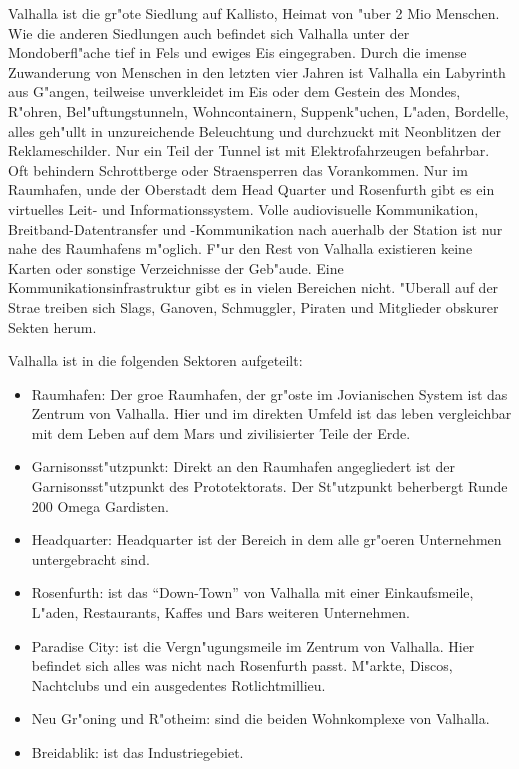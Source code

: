 
Valhalla ist die gr"o\3te Siedlung auf Kallisto, Heimat von "uber 2 Mio Menschen. Wie die anderen Siedlungen auch befindet sich Valhalla unter der Mondoberfl"ache tief in Fels und ewiges Eis eingegraben. Durch die imense Zuwanderung von Menschen in den letzten vier Jahren ist Valhalla ein Labyrinth aus G"angen, teilweise unverkleidet im Eis oder dem Gestein des Mondes, R"ohren, Bel"uftungstunneln, Wohncontainern, Suppenk"uchen, L"aden, Bordelle, alles geh"ullt in unzureichende Beleuchtung und durchzuckt mit Neonblitzen der Reklameschilder. Nur ein Teil der Tunnel ist mit Elektrofahrzeugen befahrbar. Oft behindern Schrottberge oder Stra\3ensperren das Vorankommen. Nur im Raumhafen, unde der Oberstadt dem Head Quarter und Rosenfurth gibt es ein virtuelles Leit- und Informationssystem. Volle audiovisuelle Kommunikation, Breitband-Datentransfer und -Kommunikation nach au\3erhalb der Station ist nur nahe des Raumhafens m"oglich. F"ur den Rest von Valhalla existieren keine Karten oder sonstige Verzeichnisse der Geb"aude. Eine Kommunikationsinfrastruktur gibt es in vielen Bereichen nicht. "Uberall auf der Stra\3e treiben sich Slags, Ganoven, Schmuggler, Piraten  und Mitglieder obskurer Sekten herum.


Valhalla ist in die folgenden Sektoren aufgeteilt:

\begin{itemize}
    \item Raumhafen: Der gro\3e Raumhafen, der gr"oste im Jovianischen System ist das Zentrum von Valhalla. Hier und im direkten Umfeld ist das leben vergleichbar mit dem Leben auf dem Mars und zivilisierter Teile der Erde.
    \item Garnisonsst"utzpunkt: Direkt an den Raumhafen angegliedert ist der Garnisonsst"utzpunkt des Prototektorats. Der St"utzpunkt beherbergt Runde 200 Omega Gardisten. 
    \item Headquarter: Headquarter ist der Bereich in dem alle gr"o\3eren Unternehmen untergebracht sind.
    \item Rosenfurth: ist das "`Down-Town"' von Valhalla mit einer Einkaufsmeile, L"aden, Restaurants, Kaffes und Bars weiteren Unternehmen.
    \item Paradise City: ist die Vergn"ugungsmeile im Zentrum von Valhalla. Hier befindet sich alles was nicht nach Rosenfurth passt. M"arkte, Discos, Nachtclubs und ein ausgedentes Rotlichtmillieu.
    \item Neu Gr"oning und R"otheim: sind die beiden Wohnkomplexe von Valhalla.
    \item Breidablik: ist das Industriegebiet.
\end{itemize}

